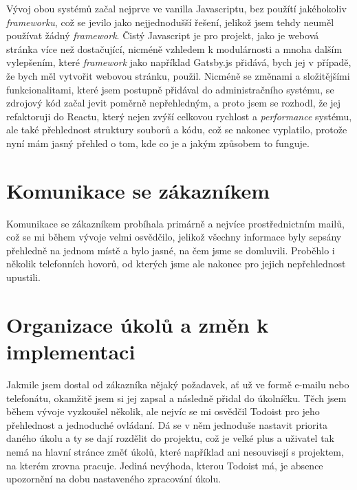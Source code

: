 \documentclass[12pt,a4paper]{report}
\begin{document}
  Vývoj obou systémů začal nejprve ve vanilla Javascriptu, bez použítí jakéhokoliv \emph{frameworku}, což
  se jevilo jako nejjednodušší řešení, jelikož jsem tehdy neuměl používat žádný \emph{framework}. Čistý Javascript 
  je pro projekt, jako je webová stránka více než
  dostačující, nicméně vzhledem k modulárnosti a mnoha dalším vylepšením, které \emph{framework} jako například Gatsby.js přidává,
  bych jej v případě, že bych měl vytvořit webovou stránku, použil.
  Nicméně se změnami a složitějšími funkcionalitami, které jsem postupně přidával do administračního systému, se zdrojový kód začal jevit
  poměrně nepřehledným, a proto jsem se rozhodl, že jej refaktoruji do Reactu, který nejen zvýší celkovou rychlost a \emph{performance} systému, 
  ale také přehlednost struktury souborů a kódu,
  což se nakonec vyplatilo, protože nyní mám jasný přehled o tom, kde co je a jakým způsobem to funguje.

  \section{Komunikace se zákazníkem}
  Komunikace se zákazníkem probíhala primárně a nejvíce prostřednictním mailů,
  což se mi během vývoje velmi osvědčilo, jelikož všechny informace byly sepsány přehledně
  na jednom místě a bylo jasné, na čem jsme se domluvili. Proběhlo i několik telefonních hovorů, od kterých jsme ale nakonec pro jejich
  nepřehlednost upustili.
 
  \section{Organizace úkolů a změn k implementaci}
  Jakmile jsem dostal od zákazníka nějaký požadavek, ať už ve formě e-mailu nebo telefonátu, okamžitě jsem si jej 
  zapsal a následně přidal do úkolníčku. Těch jsem během vývoje vyzkoušel několik, ale nejvíc se mi osvědčil 
  Todoist pro jeho přehlednost a jednoduché ovládaní. Dá se v něm jednoduše nastavit priorita daného úkolu a ty se dají rozdělit
  do projektu, což je velké plus a uživatel tak nemá na hlavní stránce změť úkolů, které například ani nesouvisejí s projektem, na kterém zrovna pracuje.
  Jediná nevýhoda, kterou Todoist má, je absence upozornění na dobu nastaveného zpracování úkolu. 
\end{document}
